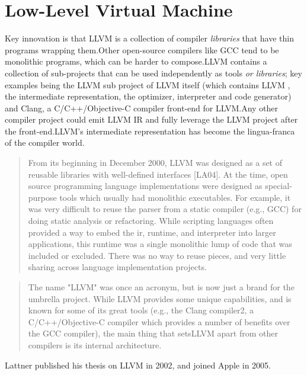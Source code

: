 \section{Low-Level Virtual Machine}

Key innovation is that LLVM is a collection of compiler \textit{libraries} that
have thin programs wrapping them.Other open-source compilers like GCC tend to be
monolithic programs, which can be harder to compose.LLVM contains a collection
of sub-projects that can be used independently as tools \textit{or libraries};
key examples being the LLVM sub project of LLVM itself (which contains LLVM ,
the intermediate representation, the optimizer, interpreter and code
generator) and Clang, a C/C++/Objective-C compiler front-end for LLVM.Any other
compiler project could emit LLVM IR and fully leverage the LLVM project after
the front-end.LLVM's intermediate representation has become the lingua-franca
of the compiler world.

\begin{quotation}
	From its beginning in December 2000,
	LLVM was designed as a set of reusable libraries with well-defined interfaces
		[LA04]. At the time, open source programming language implementations were
	designed as special-purpose tools which usually had monolithic executables. For
	example, it was very difficult to reuse the parser from a static compiler (e.g.,
	GCC) for doing static analysis or refactoring. While scripting languages often
	provided a way to embed the ir, runtime, and interpreter into larger applications,
	this runtime was a single monolithic lump of code that was included or excluded.
	There was no way to reuse pieces, and very little sharing across language
	implementation projects.\cite{aosa_vol1}
\end{quotation}

\begin{quotation}
	The name "LLVM" was once an acronym, but is now just a brand for the
	umbrella project. While LLVM provides some unique capabilities, and is known for
	some of its great tools (e.g., the Clang compiler2, a C/C++/Objective-C compiler
	which provides a number of benefits over the GCC compiler), the main thing that
	setsLLVM apart from other compilers is its internal
	architecture.\cite[LLVM]{aosa_vol1}
\end{quotation}

Lattner published his thesis
on LLVM in 2002, and joined Apple in
2005.
